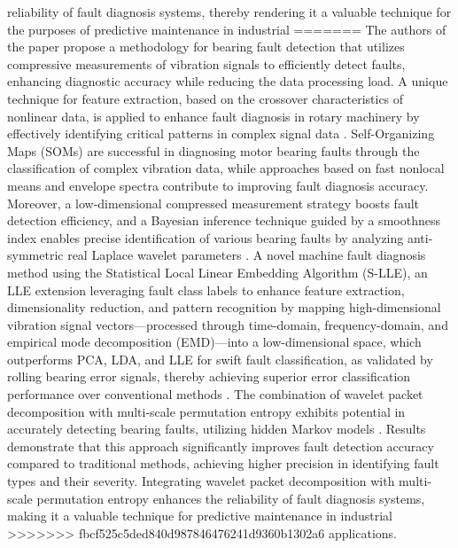 \documentclass[sn-basic,pdflatex]{sn-jnl}
\theoremstyle{remark}
\theoremstyle{definition}
\begin{document}
reliability of fault diagnosis systems, thereby rendering it a valuable
technique for the purposes of predictive maintenance in industrial
=======
The authors of the paper \citet{WOS:000335959500009} propose a
methodology for bearing fault detection that utilizes compressive
measurements of vibration signals to efficiently detect faults,
enhancing diagnostic accuracy while reducing the data processing load. A
unique technique for feature extraction, based on the crossover
characteristics of nonlinear data, is applied to enhance fault diagnosis
in rotary machinery by effectively identifying critical patterns in
complex signal data \citep{WOS:000338603900013}. Self-Organizing Maps
(SOMs) are successful in diagnosing motor bearing faults through the
classification of complex vibration data, while approaches based on fast
nonlocal means and envelope spectra contribute to improving fault
diagnosis accuracy. Moreover, a low-dimensional compressed measurement
strategy boosts fault detection efficiency, and a Bayesian inference
technique guided by a smoothness index enables precise identification of
various bearing faults by analyzing anti-symmetric real Laplace wavelet
parameters
\citep{WOS:000380543400119, WOS:000348309400067, WOS:000354607100016, WOS:000350998800016}.
A novel machine fault diagnosis method using the Statistical Local
Linear Embedding Algorithm (S-LLE), an LLE extension leveraging fault
class labels to enhance feature extraction, dimensionality reduction,
and pattern recognition by mapping high-dimensional vibration signal
vectors---processed through time-domain, frequency-domain, and empirical
mode decomposition (EMD)---into a low-dimensional space, which
outperforms PCA, LDA, and LLE for swift fault classification, as
validated by rolling bearing error signals, thereby achieving superior
error classification performance over conventional methods
\citep{WOS:000361788200068}. The combination of wavelet packet
decomposition with multi-scale permutation entropy exhibits potential in
accurately detecting bearing faults, utilizing hidden Markov models
\citep{WOS:000362513400031}. Results demonstrate that this approach
significantly improves fault detection accuracy compared to traditional
methods, achieving higher precision in identifying fault types and their
severity. Integrating wavelet packet decomposition with multi-scale
permutation entropy enhances the reliability of fault diagnosis systems,
making it a valuable technique for predictive maintenance in industrial
>>>>>>> fbcf525c5ded840d987846476241d9360b1302a6
applications.
\end{document}
